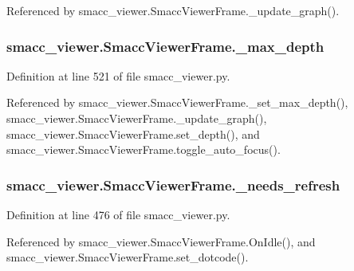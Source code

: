 Referenced by smacc\+\_\+viewer.\+Smacc\+Viewer\+Frame.\+\_\+update\+\_\+graph().

\subsubsection[{\texorpdfstring{\+\_\+max\+\_\+depth}{_max_depth}}]{\setlength{\rightskip}{0pt plus 5cm}smacc\+\_\+viewer.\+Smacc\+Viewer\+Frame.\+\_\+max\+\_\+depth\hspace{0.3cm}{\ttfamily [private]}}\hypertarget{classsmacc__viewer_1_1SmaccViewerFrame_acf8a98a2a2d4ae1f21e0fc3cd020b89a}{}\label{classsmacc__viewer_1_1SmaccViewerFrame_acf8a98a2a2d4ae1f21e0fc3cd020b89a}


Definition at line 521 of file smacc\+\_\+viewer.\+py.



Referenced by smacc\+\_\+viewer.\+Smacc\+Viewer\+Frame.\+\_\+set\+\_\+max\+\_\+depth(), smacc\+\_\+viewer.\+Smacc\+Viewer\+Frame.\+\_\+update\+\_\+graph(), smacc\+\_\+viewer.\+Smacc\+Viewer\+Frame.\+set\+\_\+depth(), and smacc\+\_\+viewer.\+Smacc\+Viewer\+Frame.\+toggle\+\_\+auto\+\_\+focus().

\subsubsection[{\texorpdfstring{\+\_\+needs\+\_\+refresh}{_needs_refresh}}]{\setlength{\rightskip}{0pt plus 5cm}smacc\+\_\+viewer.\+Smacc\+Viewer\+Frame.\+\_\+needs\+\_\+refresh\hspace{0.3cm}{\ttfamily [private]}}\hypertarget{classsmacc__viewer_1_1SmaccViewerFrame_a42ba63ae6741b2ced224cc0f8aa48bff}{}\label{classsmacc__viewer_1_1SmaccViewerFrame_a42ba63ae6741b2ced224cc0f8aa48bff}


Definition at line 476 of file smacc\+\_\+viewer.\+py.



Referenced by smacc\+\_\+viewer.\+Smacc\+Viewer\+Frame.\+On\+Idle(), and smacc\+\_\+viewer.\+Smacc\+Viewer\+Frame.\+set\+\_\+dotcode().

